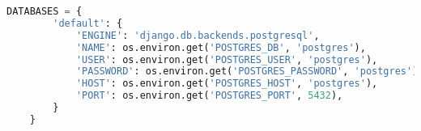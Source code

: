 \begin{lstlisting}[language=Python,caption={Django database connection object, fragment of settings.py file},breaklines=true,label={lst:djangoDbConn}]
    DATABASES = {
        'default': {
            'ENGINE': 'django.db.backends.postgresql',
            'NAME': os.environ.get('POSTGRES_DB', 'postgres'),
            'USER': os.environ.get('POSTGRES_USER', 'postgres'),
            'PASSWORD': os.environ.get('POSTGRES_PASSWORD', 'postgres'),
            'HOST': os.environ.get('POSTGRES_HOST', 'postgres'),
            'PORT': os.environ.get('POSTGRES_PORT', 5432),
        }
    }
\end{lstlisting}
